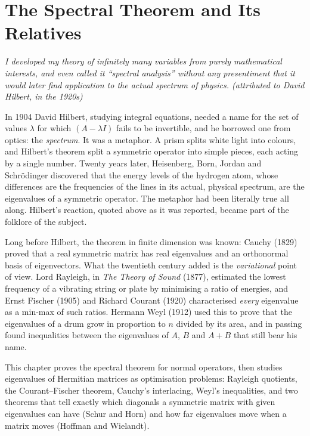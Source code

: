 \chapter{The Spectral Theorem and Its Relatives}\label{linear:ch:spectral}

\begin{center}\itshape
I developed my theory of infinitely many variables from purely mathematical interests, and even called it ``spectral
analysis'' without any presentiment that it would later find application to the actual spectrum of physics.
\upshape(attributed to David Hilbert, in the 1920s)
\end{center}

In 1904 David Hilbert, studying integral equations, needed a name for the set of values $\lambda$ for which $(A-\lambda I)$
fails to be invertible, and he borrowed one from optics: the \emph{spectrum}. It was a metaphor. A prism splits white light
into colours, and Hilbert's theorem split a symmetric operator into simple pieces, each acting by a single number. Twenty
years later, Heisenberg, Born, Jordan and Schr\"odinger discovered that the energy levels of the hydrogen atom, whose
differences are the frequencies of the lines in its actual, physical spectrum, are the eigenvalues of a symmetric
operator. The metaphor had been literally true all along. Hilbert's reaction, quoted above as it was reported, became part
of the folklore of the subject.

Long before Hilbert, the theorem in finite dimension was known: Cauchy (1829) proved that a real symmetric matrix has real
eigenvalues and an orthonormal basis of eigenvectors. What the twentieth century added is the \emph{variational} point of
view. Lord Rayleigh, in \emph{The Theory of Sound} (1877), estimated the lowest frequency of a vibrating string or plate by
minimising a ratio of energies, and Ernst Fischer (1905) and Richard Courant (1920) characterised \emph{every} eigenvalue
as a min-max of such ratios. Hermann Weyl (1912) used this to prove that the eigenvalues of a drum grow in proportion to $n$
divided by its area, and in passing found inequalities between the eigenvalues of $A$, $B$ and $A+B$ that still bear his
name.

This chapter proves the spectral theorem for normal operators, then studies eigenvalues of Hermitian matrices as
optimisation problems: Rayleigh quotients, the Courant--Fischer theorem, Cauchy's interlacing, Weyl's inequalities, and two
theorems that tell exactly which diagonals a symmetric matrix with given eigenvalues can have (Schur and Horn) and how far
eigenvalues move when a matrix moves (Hoffman and Wielandt).

